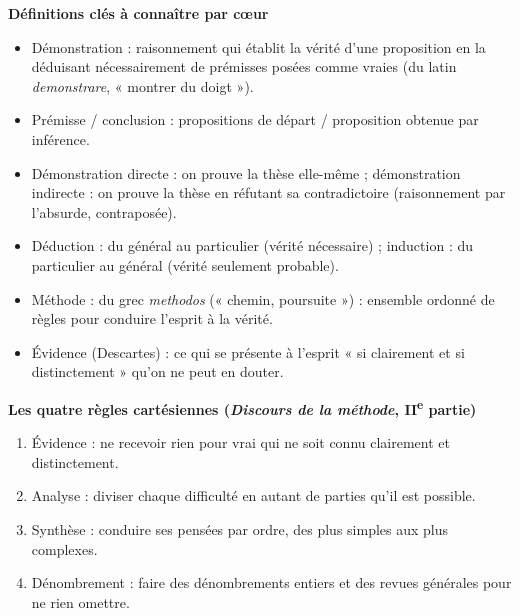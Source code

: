 \documentclass[11pt]{article}
\newcommand{\cle}[1]{{\popxbold\color{popdark}#1}}
\begin{document}
\begin{bilan}
\textbf{Définitions clés à connaître par cœur}
\begin{itemize}
  \item \cle{Démonstration} : raisonnement qui établit la vérité d'une proposition en la déduisant nécessairement de prémisses posées comme vraies (du latin \emph{demonstrare}, « montrer du doigt »).
  \item \cle{Prémisse} / \cle{conclusion} : propositions de départ / proposition obtenue par inférence.
  \item \cle{Démonstration directe} : on prouve la thèse elle-même ; \cle{démonstration indirecte} : on prouve la thèse en réfutant sa contradictoire (raisonnement par l'absurde, contraposée).
  \item \cle{Déduction} : du général au particulier (vérité nécessaire) ; \cle{induction} : du particulier au général (vérité seulement probable).
  \item \cle{Méthode} : du grec \emph{methodos} (« chemin, poursuite ») : ensemble ordonné de règles pour conduire l'esprit à la vérité.
  \item \cle{Évidence} (Descartes) : ce qui se présente à l'esprit « si clairement et si distinctement » qu'on ne peut en douter.
\end{itemize}

\textbf{Les quatre règles cartésiennes (\emph{Discours de la méthode}, II\textsuperscript{e} partie)}
\begin{enumerate}
  \item \cle{Évidence} : ne recevoir rien pour vrai qui ne soit connu clairement et distinctement.
  \item \cle{Analyse} : diviser chaque difficulté en autant de parties qu'il est possible.
  \item \cle{Synthèse} : conduire ses pensées par ordre, des plus simples aux plus complexes.
  \item \cle{Dénombrement} : faire des dénombrements entiers et des revues générales pour ne rien omettre.
\end{enumerate}


\end{bilan}
\end{document}

